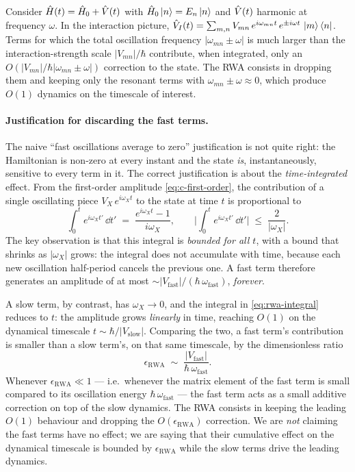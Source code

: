 \begin{statement}
\label{stmt:rwa}
Consider $\hat{H}(t)=\hat{H}_0+\hat{V}(t)$ with
$\hat{H}_0\ket{n}=E_n\ket{n}$ and $\hat{V}(t)$ harmonic at frequency
$\omega$. In the interaction picture,
$\hat{V}_I(t)=\sum_{m,n} V_{mn}\,e^{i\omega_{mn}t}\,e^{\pm i\omega t}\,
\ket{m}\bra{n}$. Terms for which the total oscillation frequency
$|\omega_{mn}\pm\omega|$ is much larger than the interaction-strength
scale $|V_{mn}|/\hbar$ contribute, when integrated, only an
$O(|V_{mn}|/\hbar|\omega_{mn}\pm\omega|)$ correction to the state.
The RWA consists in dropping them and keeping only the resonant
terms with $\omega_{mn}\pm\omega\approx0$, which produce $O(1)$
dynamics on the timescale of interest.
\end{statement}

\paragraph{Justification for discarding the fast terms.}
The naive ``fast oscillations average to zero'' justification is
not quite right: the Hamiltonian is non-zero at every instant and
the state \emph{is}, instantaneously, sensitive to every term in
it. The correct justification is about the \emph{time-integrated}
effect. From the first-order amplitude
\cref{eq:c-first-order}, the contribution of a single oscillating
piece $V_X\,e^{i\omega_X t}$ to the state at time $t$ is
proportional to
\begin{equation}
\label{eq:rwa-integral}
\int_0^t e^{i\omega_X t'}\,\dd t'
\;=\; \frac{e^{i\omega_X t}-1}{i\omega_X},
\qquad
\biggl|\int_0^t e^{i\omega_X t'}\,\dd t'\biggr| \;\leq\; \frac{2}{|\omega_X|}.
\end{equation}
The key observation is that this integral is \emph{bounded for all
$t$}, with a bound that shrinks as $|\omega_X|$ grows: the integral
does not accumulate with time, because each new oscillation
half-period cancels the previous one. A fast term therefore
generates an amplitude of at most $\sim|V_\text{fast}|/(\hbar\,\omega_\text{fast})$,
\emph{forever}.

A slow term, by contrast, has $\omega_X\to 0$, and the integral in
\cref{eq:rwa-integral} reduces to $t$: the amplitude grows
\emph{linearly} in time, reaching $O(1)$ on the dynamical timescale
$t\sim\hbar/|V_\text{slow}|$. Comparing the two, a fast term's
contribution is smaller than a slow term's, on that same
timescale, by the dimensionless ratio
\begin{equation}
\label{eq:rwa-small-parameter}
\epsilon_\text{RWA} \;\sim\; \frac{|V_\text{fast}|}{\hbar\,\omega_\text{fast}}.
\end{equation}
Whenever $\epsilon_\text{RWA}\ll 1$ --- i.e.\ whenever the matrix
element of the fast term is small compared to its oscillation
energy $\hbar\,\omega_\text{fast}$ --- the fast term acts as a
small additive correction on top of the slow dynamics. The RWA
consists in keeping the leading $O(1)$ behaviour and dropping the
$O(\epsilon_\text{RWA})$ correction. We are \emph{not} claiming
the fast terms have no effect; we are saying that their cumulative
effect on the dynamical timescale is bounded by
$\epsilon_\text{RWA}$ while the slow terms drive the leading
dynamics.

